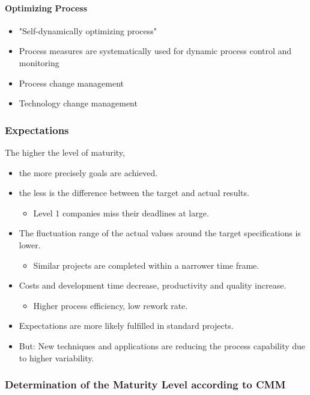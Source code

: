 \documentclass[11pt,a4paper]{article}
\begin{document}
\paragraph {Optimizing Process}
\begin {itemize} 
\item "Self-dynamically optimizing process" 
\item Process measures are systematically used for dynamic process control and
  monitoring
\item Process change management
\item Technology change management
\end {itemize}

\subsubsection{Expectations}
The higher the level of maturity, 
\begin {itemize} 
\item the more precisely goals are achieved.
\item the less is the difference between the target and actual results.
  \begin {itemize} 
  \item Level 1 companies miss their deadlines at large. 
  \end {itemize}
\item The fluctuation range of the actual values around the target
  specifications is lower.
  \begin {itemize} 
  \item Similar projects are completed within a narrower time frame.
  \end {itemize}
\item Costs and development time decrease, productivity and quality increase.
  \begin {itemize} 
  \item Higher process efficiency, low rework rate.
  \end {itemize}
\item Expectations are more likely fulfilled in standard projects.
\item But: New techniques and applications are reducing the process capability
  due to higher variability.
\end {itemize}

\subsubsection{Determination of the Maturity Level according to CMM}
\end{document}
